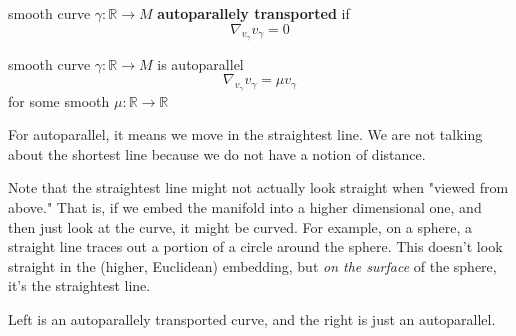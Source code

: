 \begin{definition}
	smooth curve $\gamma : \mathbb{R} \to M$ \textbf{autoparallely transported} if 
	\begin{equation}
		\nabla_{v_{\gamma}} v_{\gamma} = 0
	\end{equation}
\end{definition}

\begin{definition}
	smooth curve $\gamma : \mathbb{R} \to M$ is autoparallel 
	\begin{equation}
		\nabla_{v_{\gamma}} v_{\gamma} = \mu v_{\gamma}
	\end{equation}
for some smooth $\mu:\mathbb{R}\to \mathbb{R}$
\end{definition}

For autoparallel, it means we move in the straightest line. We are not talking about the shortest line because we do not have a notion of distance.

Note that the straightest line might not actually look straight when "viewed from above." That is, if we embed the manifold into a higher dimensional one, and then just look at the curve, it might be curved. For example, on a sphere, a straight line traces out a portion of a circle around the sphere. This doesn't look straight in the (higher, Euclidean) embedding, but \emph{on the surface} of the sphere, it's the straightest line.

\begin{center}
\end{center}
Left is an autoparallely transported curve, and the right is just an autoparallel.

